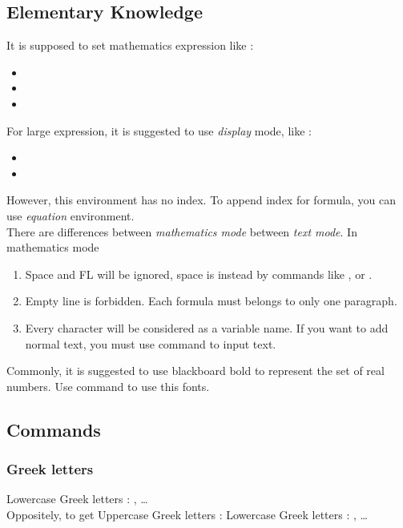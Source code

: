 \documentclass{article}
\begin{document}
\subsection{Elementary Knowledge}
It is supposed to set mathematics 
expression like :
\begin{itemize}
    \item {}
    \item {}
    \item {}  
\end{itemize}
For large expression, it is suggested to use \emph{display} mode, like :
\begin{itemize}
    \item {}
    \item {}  
\end{itemize}
However, this environment has no index. 
To append index for formula, you can use \emph{equation} environment. \\
There are differences between \emph{mathematics mode} between \emph{text mode}. In mathematics mode
\begin{enumerate}
    \item Space and FL will be ignored, space is instead by commands like
    \framebox{$\backslash$,}\;,\;
    or .
    \item Empty line is forbidden. Each formula must belongs to only one paragraph.
    \item Every character will be considered as a variable name. 
    If you want to add normal text, you must use command 
     to input text.
\end{enumerate}
Commonly, it is suggested to use blackboard bold to represent the set of 
real numbers. Use command  to use this fonts.

\subsection{Commands}

\subsubsection{Greek letters}
Lowercase Greek letters : 
 , \ldots \\
\indent
Oppositely, to get Uppercase Greek letters :
Lowercase Greek letters : 
 , \ldots 
\end{document}
